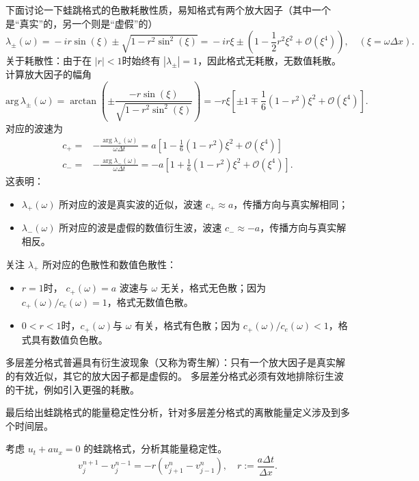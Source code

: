 下面讨论一下蛙跳格式的色散耗散性质，易知格式有两个放大因子（其中一个是“真实”的，另一个则是“虚假”的）
\[
    \lambda_{\pm}(\omega) ={} - i r \sin(\xi) \pm \sqrt{1 - r^2 \sin^2(\xi)}
    ={}  - i r \xi \pm \left(
    1 - \frac12 r^2 \xi^2 + \mathcal{O}(\xi^4)
    \right), \quad (\xi = \omega \Delta x).
\]
关于耗散性：由于在 $|r| < 1$时始终有 $|\lambda_\pm| = 1$，因此格式无耗散，无数值耗散。
计算放大因子的幅角
\[
    \text{arg}\, \lambda_\pm(\omega)
        ={}
    \arctan \left( \pm \frac{
        - r \sin(\xi)
    }{
        \sqrt{1 - r^2 \sin^2(\xi)}
    }     \right)
    = - r \xi \left[
        \pm 1 \mp \frac16 (1-r^2) \xi^2 + \mathcal{O}(\xi^4)
        \right].
\]
对应的波速为
\begin{align*}
    c_+ ={} & - \frac{\arg \lambda_+(\omega)}{ \omega\Delta t} = a  \left[
        1 - \frac16 (1-r^2) \xi^2 +  \mathcal{O}(\xi^4)
    \right]                                                                  \\
    c_- ={} & - \frac{\arg \lambda_-(\omega)}{ \omega\Delta t} = - a  \left[
        1 + \frac16 (1-r^2) \xi^2 +  \mathcal{O}(\xi^4)
        \right].
\end{align*}
这表明：
\begin{itemize}
    \item $\lambda_+(\omega)$ 所对应的波是真实波的近似，波速 $c_+ \approx a$，传播方向与真实解相同；
    \item $\lambda_-(\omega)$ 所对应的波是虚假的数值衍生波，波速 $c_- \approx -a$，传播方向与真实解相反。
\end{itemize}
关注 $\lambda_+$ 所对应的色散性和数值色散性：
\begin{itemize}
    \item $r=1$时， $c_+(\omega) = a$ 波速与 $\omega$ 无关，格式无色散；因为 $c_+(\omega) / c_e(\omega) = 1$，格式无数值色散。
    \item $0<r<1$时，$c_+(\omega)$与 $\omega$ 有关，格式有色散；因为 $c_+(\omega) / c_e(\omega) < 1$，格式具有数值负色散。
\end{itemize}

\begin{remark}
    多层差分格式普遍具有衍生波现象（又称为寄生解）：只有一个放大因子是真实解的有效近似，其它的放大因子都是虚假的。
    多层差分格式必须有效地排除衍生波的干扰，例如引入更强的耗散。
\end{remark}

最后给出蛙跳格式的能量稳定性分析，针对多层差分格式的离散能量定义涉及到多个时间层。
\begin{example}
    考虑 $u_t + a u_x = 0$ 的蛙跳格式，分析其能量稳定性。
    \[
        v_j^{n+1}-v_j^{n-1} =
        - r (v_{j+1}^n - v_{j-1}^{n}),\quad r := \frac{a \Delta t}{\Delta x}.
    \]
\end{example}

